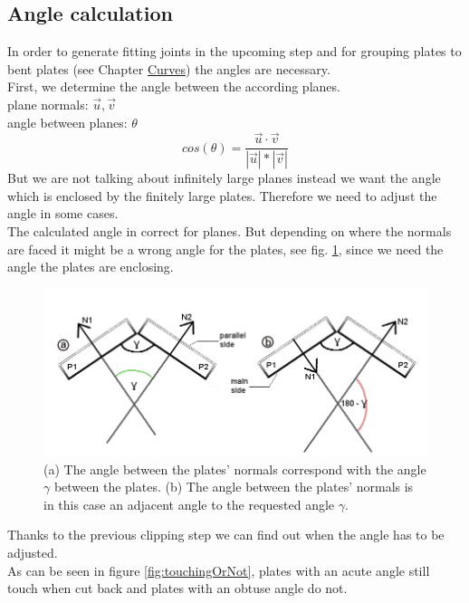 \documentclass[../ClassicThesis.tex]{subfiles}
\begin{document}
\subsection{Angle calculation}\label{angleCalculation}
In order to generate fitting joints in the upcoming step and for grouping plates to bent plates (see Chapter \hyperref[ch:curves]{Curves}) the angles are necessary.\\
First, we determine the angle between the according planes.\\
plane normals: $\vec{u}, \vec{v}$\\
angle between planes: $\theta$
$$ cos(\theta) = \frac{\vec{u} \cdot \vec{v}}{|\vec{u}| * |\vec{v}|}$$
But we are not talking about infinitely large planes instead we want the angle which is enclosed by the finitely large plates. Therefore we need to adjust the angle in some cases.\\
The calculated angle in correct for planes. But depending on where the normals are faced it might be a wrong angle for the plates, see fig. \ref{fig:wrongAngle}, since we need the angle the plates are enclosing.
\begin{figure}[!ht]
\centering
\includegraphics[width= 1\columnwidth]{Images/anglesExamplesSmall.png}
\caption{(a) The angle between the plates' normals correspond with the angle $\gamma$ between the plates. (b) The angle between the plates' normals is in this case an adjacent angle to the requested angle $\gamma$.}
\label{fig:wrongAngle}
\end{figure}
Thanks to the previous clipping step we can find out when the angle has to be adjusted.\\
As can be seen in figure \ref{fig:touchingOrNot}, plates with an acute angle still touch when cut back and plates with an obtuse angle do not.
\end{document}
